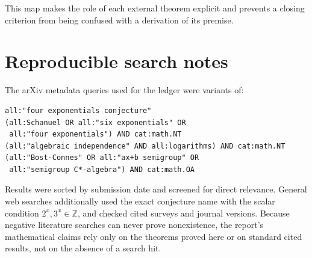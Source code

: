 \documentclass[11pt,oneside]{article}
\theoremstyle{definition}
\theoremstyle{remark}
\newcommand{\Z}{\mathbb Z}
\begin{document}
This map makes the role of each external theorem explicit and prevents
a closing criterion from being confused with a derivation of its
premise.

\section{Reproducible search notes}

The arXiv metadata queries used for the ledger were variants of:

\begin{verbatim}
all:"four exponentials conjecture"
(all:Schanuel OR all:"six exponentials" OR
 all:"four exponentials") AND cat:math.NT
(all:"algebraic independence" AND all:logarithms) AND cat:math.NT
(all:"Bost-Connes" OR all:"ax+b semigroup" OR
 all:"semigroup C*-algebra") AND cat:math.OA
\end{verbatim}

Results were sorted by submission date and screened for direct
relevance.  General web searches additionally used the exact conjecture
name with the scalar condition \(2^x,3^x\in\Z\), and checked cited
surveys and journal versions.  Because negative literature searches can
never prove nonexistence, the report's mathematical claims rely only on
the theorems proved here or on standard cited results, not on the
absence of a search hit.
\end{document}
